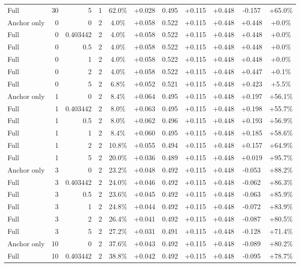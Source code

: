 \begin{table}[htbp]
\begin{tabular}{lrrrccccccc}
Full & 30 & 5 & 1 & 62.0\% & +0.028 & 0.495 & +0.115 & +0.448 & -0.157 & +65.0\% \\
Anchor only & 0 & 0 & 2 & 4.0\% & +0.058 & 0.522 & +0.115 & +0.448 & +0.448 & +0.0\% \\
Full & 0 & 0.403442 & 2 & 4.0\% & +0.058 & 0.522 & +0.115 & +0.448 & +0.448 & +0.0\% \\
Full & 0 & 0.5 & 2 & 4.0\% & +0.058 & 0.522 & +0.115 & +0.448 & +0.448 & +0.0\% \\
Full & 0 & 1 & 2 & 4.0\% & +0.058 & 0.522 & +0.115 & +0.448 & +0.448 & +0.0\% \\
Full & 0 & 2 & 2 & 4.0\% & +0.058 & 0.522 & +0.115 & +0.448 & +0.447 & +0.1\% \\
Full & 0 & 5 & 2 & 6.8\% & +0.052 & 0.521 & +0.115 & +0.448 & +0.423 & +5.5\% \\
Anchor only & 1 & 0 & 2 & 8.4\% & +0.064 & 0.495 & +0.115 & +0.448 & +0.197 & +56.1\% \\
Full & 1 & 0.403442 & 2 & 8.0\% & +0.063 & 0.495 & +0.115 & +0.448 & +0.198 & +55.7\% \\
Full & 1 & 0.5 & 2 & 8.0\% & +0.062 & 0.496 & +0.115 & +0.448 & +0.193 & +56.9\% \\
Full & 1 & 1 & 2 & 8.4\% & +0.060 & 0.495 & +0.115 & +0.448 & +0.185 & +58.6\% \\
Full & 1 & 2 & 2 & 10.8\% & +0.055 & 0.494 & +0.115 & +0.448 & +0.157 & +64.9\% \\
Full & 1 & 5 & 2 & 20.0\% & +0.036 & 0.489 & +0.115 & +0.448 & +0.019 & +95.7\% \\
Anchor only & 3 & 0 & 2 & 23.2\% & +0.048 & 0.492 & +0.115 & +0.448 & -0.053 & +88.2\% \\
Full & 3 & 0.403442 & 2 & 24.0\% & +0.046 & 0.492 & +0.115 & +0.448 & -0.062 & +86.3\% \\
Full & 3 & 0.5 & 2 & 23.6\% & +0.045 & 0.492 & +0.115 & +0.448 & -0.063 & +85.9\% \\
Full & 3 & 1 & 2 & 24.8\% & +0.044 & 0.492 & +0.115 & +0.448 & -0.072 & +83.9\% \\
Full & 3 & 2 & 2 & 26.4\% & +0.041 & 0.492 & +0.115 & +0.448 & -0.087 & +80.5\% \\
Full & 3 & 5 & 2 & 27.2\% & +0.031 & 0.491 & +0.115 & +0.448 & -0.128 & +71.4\% \\
Anchor only & 10 & 0 & 2 & 37.6\% & +0.043 & 0.492 & +0.115 & +0.448 & -0.089 & +80.2\% \\
Full & 10 & 0.403442 & 2 & 38.8\% & +0.042 & 0.492 & +0.115 & +0.448 & -0.095 & +78.7\% \\

\end{tabular}
\end{table}
